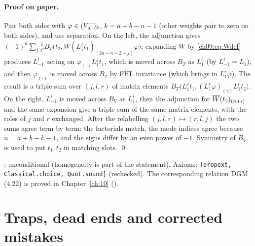 \paragraph{Proof on paper.} Pair both sides with $\varphi\in(V_{\Lambda}^{+})_k$, $k=a+b-n-1$ (other weights
pair to zero on both sides), and use separation. On the left, the adjunction gives
$(-1)^a\sum_j\frac1{j!}B_T\big(t_2,W(L_1^jt_1)_{(2a-n-2-j)}\varphi\big)$; expanding $W$ by
\eqref{ch09:eq:Wdef} produces $L_{-1}^l$ acting on $\varphi_{(\cdot)}L_1^jt_1$, which is moved across
$B_T$ as $L_1^l$ (by $L_{-1}^t=L_1$), and then $\varphi_{(\cdot)}$ is moved across $B_T$ by FHL
invariance (which brings in $L_1^r\varphi$). The result is a triple sum over $(j,l,r)$ of
matrix elements $B_T\big(L_1^jt_1,(L_1^r\varphi)_{(\gamma)}L_1^lt_2\big)$. On the right, $L_{-1}^i$ is
moved across $B_V$ as $L_1^i$, then the adjunction for $\overline{W}(t_2)_{(n+i)}$ and the same
expansion give a triple sum of the same matrix elements, with the roles of $j$ and $r$ exchanged.
After the relabelling $(j,l,r)\mapsto(r,l,j)$ the two sums agree term by term: the factorials match,
the mode indices agree because $n=a+b-k-1$, and the signs differ by an even power of $-1$. Symmetry of
$B_T$ is used to put $t_1,t_2$ in matching slots. \qed

\begin{status}
: unconditional (homogeneity is part of the statement). Axioms:
\texttt{[propext, Classical.choice, Quot.sound]} (rechecked). The corresponding relation DGM
(4.22) is proved in Chapter~\ref{ch:10} ().
\end{status}

\section{Traps, dead ends and corrected mistakes}\label{ch09:sec:deadends}


